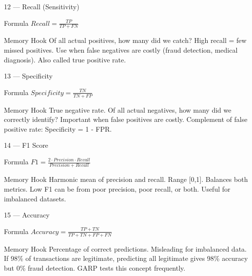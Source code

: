 \documentclass[aspectratio=169,8pt]{beamer}
\begin{document}
	\begin{frame}{12 --- Recall (Sensitivity)}
		\begin{block}{Formula}
			$Recall = \frac{TP}{TP + FN}$
		\end{block}
		\begin{block}{Memory Hook}
			Of all actual positives, how many did we catch? High recall = few missed positives. Use when false negatives are costly (fraud detection, medical diagnosis). Also called true positive rate.
		\end{block}
	\end{frame}
	
	\begin{frame}{13 --- Specificity}
		\begin{block}{Formula}
			$Specificity = \frac{TN}{TN + FP}$
		\end{block}
		\begin{block}{Memory Hook}
			True negative rate. Of all actual negatives, how many did we correctly identify? Important when false positives are costly. Complement of false positive rate: Specificity = 1 - FPR.
		\end{block}
	\end{frame}
	
	\begin{frame}{14 --- F1 Score}
		\begin{block}{Formula}
			$F1 = \frac{2 \cdot Precision \cdot Recall}{Precision + Recall}$
		\end{block}
		\begin{block}{Memory Hook}
			Harmonic mean of precision and recall. Range [0,1]. Balances both metrics. Low F1 can be from poor precision, poor recall, or both. Useful for imbalanced datasets.
		\end{block}
	\end{frame}
	
	\begin{frame}{15 --- Accuracy}
		\begin{block}{Formula}
			$Accuracy = \frac{TP + TN}{TP + TN + FP + FN}$
		\end{block}
		\begin{block}{Memory Hook}
			Percentage of correct predictions. Misleading for imbalanced data. If 98\% of transactions are legitimate, predicting all legitimate gives 98\% accuracy but 0\% fraud detection. GARP tests this concept frequently.
		\end{block}
	\end{frame}
	
\end{document}
